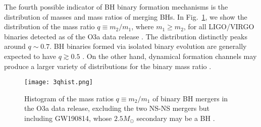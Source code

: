 \documentclass[
        fleqn,
        usenatbib,
    ]{mnras}
\begin{document}
The fourth possible indicator of BH binary formation mechanisms is the
distribution of masses and mass ratios of merging BHs. In Fig.~\ref{fig:qhist},
we show the distribution of the mass ratio $q \equiv m_2 / m_1$, where $m_1 \geq
m_2$, for all LIGO/VIRGO binaries detected as of the O3a data release
\citep{LIGOO3a}. The distribution distinctly peaks around $q \sim 0.7$. BH
binaries formed via isolated binary evolution are generally expected to have $q
\gtrsim 0.5$ \citep{belczynski2016first, olejak2020}. On the other hand,
dynamical formation channels may produce a larger variety of distributions for
the binary mass ratio \citep[e.g.,][]{rodriguez2016binary, silsbee2017lidov,
fragione2019}.

\begin{figure}
    \centering
    \texttt{[image: 3qhist.png]}
    \caption{Histogram of the mass ratios $q \equiv m_2 / m_1$ of binary BH
    mergers in the O3a data release, excluding the two NS-NS mergers but including
    GW190814, whose $2.5M_{\odot}$ secondary may be a BH \citep{LIGOO3a}.
    }\label{fig:qhist}
\end{figure}
\end{document}
